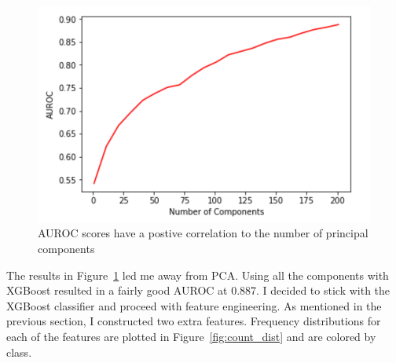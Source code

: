 \documentclass[11pt,letterpaper]{article}
\begin{document}
\begin{figure}[h!]
    \centering
        \includegraphics[width=.5\textwidth]{pca_auc.png}
        \caption{AUROC scores have a postive correlation to the number of
principal components}
        \label{fig:pca_auc}
\end{figure}

The results in Figure~\ref{fig:pca_auc} led me away from PCA.  Using all the components
with XGBoost resulted in a fairly good AUROC at 0.887.  I decided to stick with the
XGBoost classifier and proceed with feature engineering.  As mentioned in the
previous section, I constructed two extra features.  Frequency distributions for
each of the features are plotted in Figure~\ref{fig:count_dist} and are colored by
class.
\end{document}
